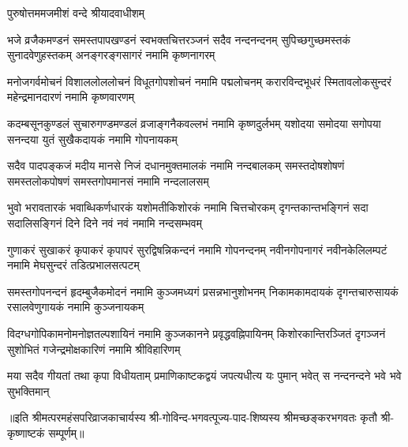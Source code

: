 
{पुरुषोत्तममजमीशं वन्दे श्रीयादवाधीशम्}

\fourlineindentedshloka
{भजे व्रजैकमण्डनं समस्तपापखण्डनं}
{स्वभक्तचित्तरञ्जनं सदैव नन्दनन्दनम्}
{सुपिच्छगुच्छमस्तकं सुनादवेणुहस्तकम्}
{अनङ्गरङ्गसागरं नमामि कृष्णनागरम्}

\fourlineindentedshloka
{मनोजगर्वमोचनं विशाललोललोचनं}
{विधूतगोपशोचनं नमामि पद्मलोचनम्}
{करारविन्दभूधरं स्मितावलोकसुन्दरं}
{महेन्द्रमानदारणं नमामि कृष्णवारणम्}

\fourlineindentedshloka
{कदम्बसूनकुण्डलं सुचारुगण्डमण्डलं}
{व्रजाङ्गनैकवल्लभं नमामि कृष्णदुर्लभम्}
{यशोदया समोदया सगोपया सनन्दया}
{युतं सुखैकदायकं नमामि गोपनायकम्}

\fourlineindentedshloka
{सदैव पादपङ्कजं मदीय मानसे निजं}
{दधानमुक्तमालकं नमामि नन्दबालकम्}
{समस्तदोषशोषणं समस्तलोकपोषणं}
{समस्तगोपमानसं नमामि नन्दलालसम्}

\fourlineindentedshloka
{भुवो भरावतारकं भवाब्धिकर्णधारकं}
{यशोमतीकिशोरकं नमामि चित्तचोरकम्}
{दृगन्तकान्तभङ्गिनं सदा सदालिसङ्गिनं}
{दिने दिने नवं नवं नमामि नन्दसम्भवम्}

\fourlineindentedshloka
{गुणाकरं सुखाकरं कृपाकरं कृपापरं}
{सुरद्विषन्निकन्दनं नमामि गोपनन्दनम्}
{नवीनगोपनागरं नवीनकेलिलम्पटं}
{नमामि मेघसुन्दरं तडित्प्रभालसत्पटम्}

\fourlineindentedshloka
{समस्तगोपनन्दनं हृदम्बुजैकमोदनं}
{नमामि कुञ्जमध्यगं प्रसन्नभानुशोभनम्}
{निकामकामदायकं दृगन्तचारुसायकं}
{रसालवेणुगायकं नमामि कुञ्जनायकम्}

\fourlineindentedshloka
{विदग्धगोपिकामनोमनोज्ञतल्पशायिनं}
{नमामि कुञ्जकानने प्रवृद्धवह्निपायिनम्}
{किशोरकान्तिरञ्जितं दृगञ्जनं सुशोभितं}
{गजेन्द्रमोक्षकारिणं नमामि श्रीविहारिणम्}

{मया सदैव गीयतां तथा कृपा विधीयताम्}
{प्रमाणिकाष्टकद्वयं जपत्यधीत्य यः पुमान्}
{भवेत् स नन्दनन्दने भवे भवे सुभक्तिमान्}

॥इति श्रीमत्परमहंसपरिव्राजकाचार्यस्य श्री-गोविन्द-भगवत्पूज्य-पाद-शिष्यस्य
श्रीमच्छङ्करभगवतः कृतौ श्री-कृष्णाष्टकं सम्पूर्णम्॥